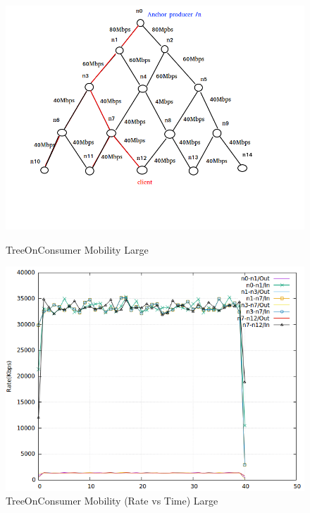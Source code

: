 \begin{figure}[H]

\begin{center}

\includegraphics[scale = 0.4]{Figures/Mob3.png}

\caption{TreeOnConsumer Mobility Large} \label{Mob3} 


\includegraphics[scale = 0.4]{Figures/mob3.png}

\caption{TreeOnConsumer Mobility (Rate vs Time) Large} \label{mob3} 


\end{center}

\end{figure}





